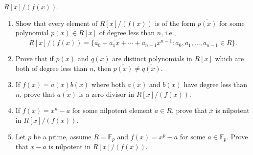 \documentclass[9pt]{article}
\newcommand{\F}{\mathbb{F}}
\begin{document}
\begin{enumerate}
                  $R[x]/(f(x))$.
                  \begin{enumerate}
                     \item Show that every element of $R[x]/(f(x))$ is of the
                           form $\overline{p(x)}$ for some polynomial
                           $p(x) \in R[x]$ of degree less than $n$, i.e.,
                           $$R[x]/(f(x)) = \{\overline{a_0} + \overline{a_1x}
                             + \cdots + \overline{a_{n-1}x^{n-1}} : a_0, a_1, 
                             \ldots, a_{n-1} \in R\}.$$
                     \item Prove that if $p(x)$ and $q(x)$ are distinct
                           polynomials in $R[x]$ which are both of degree less
                           than $n$, then $\overline{p(x)} \neq\overline{q(x)}$.
                     \item If $f(x) = a(x)b(x)$ where both $a(x)$ and $b(x)$
                           have degree less than $n$, prove that
                           $\overline{a(x)}$ is a zero divisor in $R[x]/(f(x))$.
                     \item If $f(x) = x^n - a$ for some nilpotent element
                           $a \in R$, prove that $\overline{x}$ is nilpotent in
                           $R[x]/(f(x))$.
                     \item Let $p$ be a prime, assume $R = \F_p$ and
                           $f(x) = x^p - a$ for some $a \in \F_p$. Prove that
                           $\overline{x-a}$ is nilpotent in $R[x]/(f(x))$.
                  \end{enumerate}
\end{enumerate}
\end{document}
